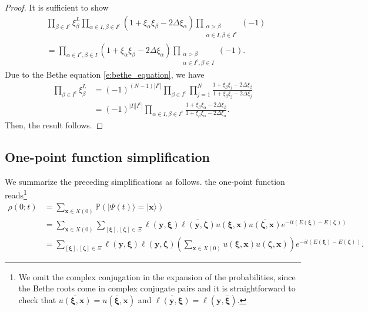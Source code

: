 \documentclass[a4paper,11pt]{article}
\theoremstyle{definition}
\begin{document}
\begin{proof}
It is sufficient to show
\begin{equation}
\begin{split}
    &\prod_{\beta\in I^c}\xi_{\beta}^L\prod_{\alpha \in I, \beta \in I^c} (1+ \xi_{\alpha} \xi_{\beta} - 2 \Delta \xi_{\alpha})\prod_{\substack{\alpha >\beta \\\alpha \in I, \beta \in I^c}}(-1)\\
    &= \prod_{\alpha \in I^c, \beta \in I} (1+ \xi_{\alpha} \xi_{\beta} - 2 \Delta \xi_{\alpha})\prod_{\substack{\alpha >\beta \\\alpha \in I^c, \beta \in I}}(-1).
\end{split}
\end{equation}
Due to the Bethe equation \eqref{e:bethe_equation}, we have
\begin{equation}
\begin{split}
    \prod_{\beta \in I^c} \xi_{\beta}^L &= (-1)^{(N-1)|I^c|}\prod_{\beta \in I^c} \prod_{j =1}^N \frac{1 + \xi_{\beta} \xi_j - 2 \Delta \xi_{\beta}}{1 + \xi_{\beta} \xi_j - 2 \Delta \xi_{j}}\\
    &= (-1)^{|I||I^c|}\prod_{\alpha \in I, \beta \in I^c}\frac{1 + \xi_{\beta} \xi_{\alpha} - 2 \Delta\xi_{\beta}}{1 + \xi_{\beta} \xi_{\alpha} - 2 \Delta\xi_{\alpha}}.
\end{split}
\end{equation}
Then, the result follows.
\end{proof}


\subsection{One-point function simplification}
We summarize the preceding simplifications as follows.
the one-point function reads\footnote{We omit the complex conjugation in the expansion of the probabilities, since the Bethe roots come in complex conjugate pairs and it is straightforward to check that $\overline{u(\boldsymbol{\xi},\textbf{x})}=u\left(\overline{\boldsymbol{\xi}},\textbf{x}\right)$ and $\overline{\ell(\textbf{y},\boldsymbol{\xi})}=\ell\left(\textbf{y},\overline{\boldsymbol{\xi}}\right)$.}
\begin{equation}
\begin{split}
    \rho(0;t) &= \sum_{\mathbf{x} \in X(0)} \mathbb{P}(|\Psi(t) \rangle = | \mathbf{x}\rangle)\\
    &=\sum_{\mathbf{x} \in X(0)} \sum_{[\boldsymbol{\xi}], [\boldsymbol{\zeta}] \in \Xi}\ell(\mathbf{y}, \boldsymbol{\xi})\overline{\ell(\mathbf{y}, \boldsymbol{\zeta})} u(\boldsymbol{\xi}, \mathbf{x})\overline{u(\boldsymbol{\zeta}, \mathbf{x})} e^{-it(E(\boldsymbol{\xi})-E(\boldsymbol{\zeta}))}\\
    &=\sum_{[\boldsymbol{\xi}], [\boldsymbol{\zeta}] \in \Xi}\ell(\mathbf{y}, \boldsymbol{\xi})\ell(\mathbf{y}, \boldsymbol{\zeta}) \left(\sum_{\mathbf{x} \in X(0)}u(\boldsymbol{\xi}, \mathbf{x})u(\boldsymbol{\zeta}, \mathbf{x})\right) e^{-it(E(\boldsymbol{\xi})-E(\boldsymbol{\zeta}))}.
\end{split}
\end{equation}
\end{document}
